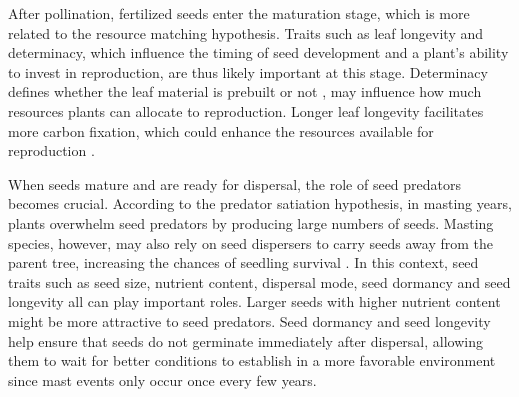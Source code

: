 \documentclass[11pt,letter]{article}
\begin{document}
After pollination, fertilized seeds enter the maturation stage, which is more related to the resource matching hypothesis. Traits such as leaf longevity and determinacy, which influence the timing of seed development and a plant's ability to invest in reproduction, are thus likely important at this stage. Determinacy defines whether the leaf material is prebuilt or not \citep{lechowicz1984temperate}, may influence how much resources plants can allocate to reproduction.  Longer leaf longevity facilitates more carbon fixation, which could enhance the resources available for reproduction \citep{adler2014functional}. \par
When seeds mature and are ready for dispersal, the role of seed predators becomes crucial. According to the predator satiation hypothesis, in masting years, plants overwhelm seed predators by producing large numbers of seeds. Masting species, however, may also rely on seed dispersers to carry seeds away from the parent tree, increasing the chances of seedling survival \citep{janzen1971seed, silvertown1980evolutionary}. In this context, seed traits such as seed size, nutrient content, dispersal mode, seed dormancy and seed longevity all can play important roles. Larger seeds with higher nutrient content might be more attractive to seed predators. Seed dormancy and seed longevity help ensure that seeds do not germinate immediately after dispersal, allowing them to wait for better conditions to establish in a more favorable environment since mast events only occur once every few years.\par
\end{document}
